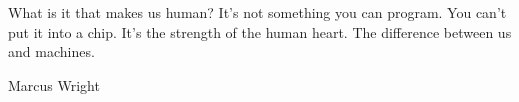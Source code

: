 What is it that makes us human? It's not something you can
program. You can't put it into a chip. It's the strength of the human
heart. The difference between us and machines.

Marcus Wright